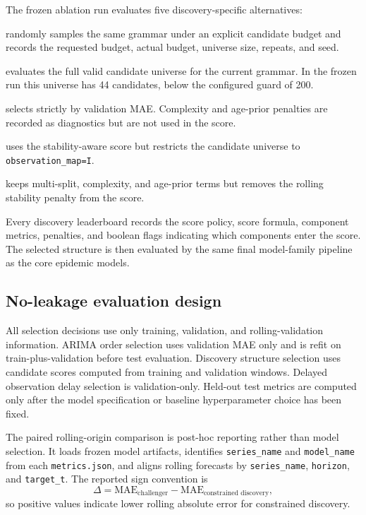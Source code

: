 The frozen ablation run evaluates five discovery-specific alternatives:
\begin{description}[leftmargin=1.5em]
\item[\texttt{random\_structure\_discovery}] randomly samples the same grammar
under an explicit candidate budget and records the requested budget, actual
budget, universe size, repeats, and seed.
\item[\texttt{exhaustive\_structure\_discovery}] evaluates the full valid
candidate universe for the current grammar. In the frozen run this universe has
44 candidates, below the configured guard of 200.
\item[\texttt{validation\_only\_structure\_selection}] selects strictly by
validation MAE. Complexity and age-prior penalties are recorded as diagnostics
but are not used in the score.
\item[\texttt{no\_observation\_search\_discovery}] uses the stability-aware
score but restricts the candidate universe to \texttt{observation\_map=I}.
\item[\texttt{no\_stability\_discovery}] keeps multi-split, complexity, and
age-prior terms but removes the rolling stability penalty from the score.
\end{description}

Every discovery leaderboard records the score policy, score formula, component
metrics, penalties, and boolean flags indicating which components enter the
score. The selected structure is then evaluated by the same final model-family
pipeline as the core epidemic models.

\subsection{No-leakage evaluation design}

All selection decisions use only training, validation, and rolling-validation
information. ARIMA order selection uses validation MAE only and is refit on
train-plus-validation before test evaluation. Discovery structure selection
uses candidate scores computed from training and validation windows. Delayed
observation delay selection is validation-only. Held-out test metrics are
computed only after the model specification or baseline hyperparameter choice
has been fixed.

The paired rolling-origin comparison is post-hoc reporting rather than model
selection. It loads frozen model artifacts, identifies \texttt{series\_name}
and \texttt{model\_name} from each \texttt{metrics.json}, and aligns rolling
forecasts by \texttt{series\_name}, \texttt{horizon}, and \texttt{target\_t}.
The reported sign convention is
\[
\Delta = \text{MAE}_{\text{challenger}} -
         \text{MAE}_{\text{constrained discovery}},
\]
so positive values indicate lower rolling absolute error for constrained
discovery.

